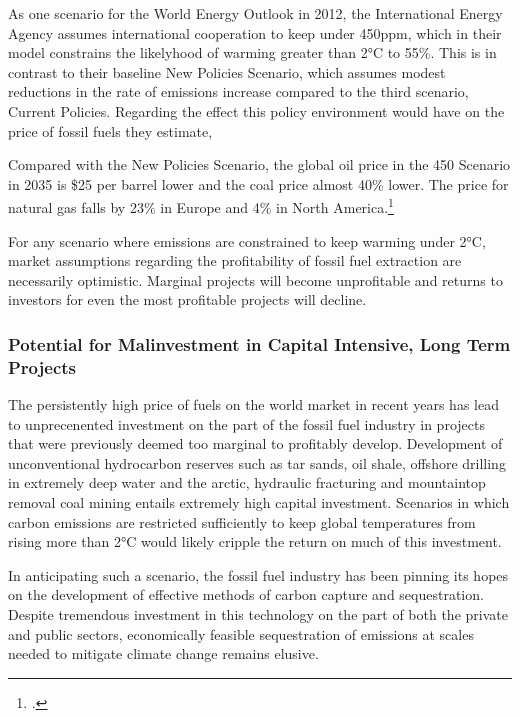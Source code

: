 As one scenario for the World Energy Outlook in 2012, the International Energy Agency assumes international cooperation to keep  under 450ppm, which in their model constrains the likelyhood of warming greater than 2°C to 55\%. This is in contrast to their baseline New Policies Scenario, which assumes modest reductions in the rate of emissions increase compared to the third scenario, Current Policies. Regarding the effect this policy environment would have on the price of fossil fuels they estimate,
\begin{slquote}Compared with the New Policies Scenario, the global oil price in the 450 Scenario in 2035 is \$25 per barrel lower and the coal price almost 40\% lower. The price for natural gas falls by 23\% in Europe and 4\% in North America.\footcite[][p. 257]{IEA2012}\end{slquote}

For any scenario where emissions are constrained to keep warming under 2°C, market assumptions regarding the profitability of fossil fuel extraction are necessarily optimistic. Marginal projects will become unprofitable and returns to investors for even the most profitable projects will decline. 


\subsubsection {Potential for Malinvestment in Capital Intensive, Long Term Projects}

The persistently high price of fuels on the world market in recent years has lead to unprecenented investment on the part of the fossil fuel industry in projects that were previously deemed too marginal to profitably develop. Development of unconventional hydrocarbon reserves such as tar sands, oil shale, offshore drilling in extremely deep water and the arctic, hydraulic fracturing and mountaintop removal coal mining entails extremely high capital investment. Scenarios in which carbon emissions are restricted sufficiently to keep global temperatures from rising more than 2°C would likely cripple the return on much of this investment.

In anticipating such a scenario, the fossil fuel industry has been pinning its hopes on the development of effective methods of carbon capture and sequestration. Despite tremendous investment in this technology on the part of both the private and public sectors, economically feasible sequestration of emissions at scales needed to mitigate climate change remains elusive.

